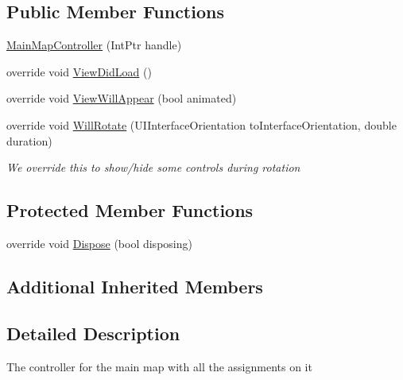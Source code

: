 \subsection*{Public Member Functions}
\begin{DoxyCompactItemize}
\item 
\hyperlink{class_field_service_1_1i_o_s_1_1_main_map_controller_ae121b4968bc3809d925a0e51ebd5c52e}{Main\+Map\+Controller} (Int\+Ptr handle)
\item 
override void \hyperlink{class_field_service_1_1i_o_s_1_1_main_map_controller_abe35533ed0f8f1ef7f34f70ec8b5a22c}{View\+Did\+Load} ()
\item 
override void \hyperlink{class_field_service_1_1i_o_s_1_1_main_map_controller_a89480f98813ea747f7f92e237bb7b65d}{View\+Will\+Appear} (bool animated)
\item 
override void \hyperlink{class_field_service_1_1i_o_s_1_1_main_map_controller_a9c5c2f4f4db557bcdacfd0a3271c123c}{Will\+Rotate} (U\+I\+Interface\+Orientation to\+Interface\+Orientation, double duration)
\begin{DoxyCompactList}\small\item\em We override this to show/hide some controls during rotation \end{DoxyCompactList}\end{DoxyCompactItemize}
\subsection*{Protected Member Functions}
\begin{DoxyCompactItemize}
\item 
override void \hyperlink{class_field_service_1_1i_o_s_1_1_main_map_controller_a349ff2489c616573fefcecbf40f20433}{Dispose} (bool disposing)
\end{DoxyCompactItemize}
\subsection*{Additional Inherited Members}


\subsection{Detailed Description}
The controller for the main map with all the assignments on it 




